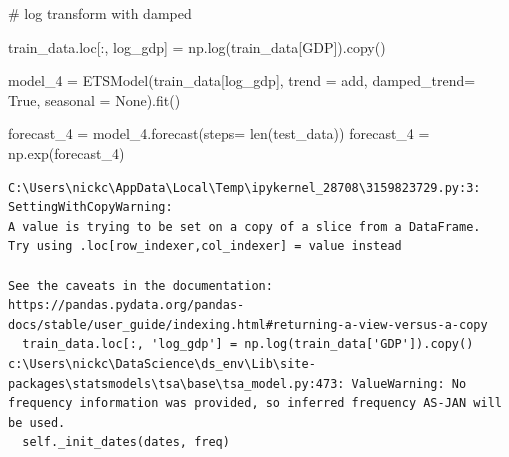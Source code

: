 \documentclass[
  11pt,
]{article}
\newenvironment{Shaded}{\begin{snugshade}}{\end{snugshade}}
\newcommand{\BuiltInTok}[1]{\textcolor[rgb]{0.00,0.23,0.31}{#1}}
\newcommand{\CommentTok}[1]{\textcolor[rgb]{0.37,0.37,0.37}{#1}}
\newcommand{\NormalTok}[1]{\textcolor[rgb]{0.00,0.23,0.31}{#1}}
\newcommand{\OperatorTok}[1]{\textcolor[rgb]{0.37,0.37,0.37}{#1}}
\newcommand{\StringTok}[1]{\textcolor[rgb]{0.13,0.47,0.30}{#1}}
\newcommand{\VariableTok}[1]{\textcolor[rgb]{0.07,0.07,0.07}{#1}}
\begin{document}
\begin{Shaded}
\begin{Highlighting}[]
\CommentTok{\# log transform with damped}

\NormalTok{train\_data.loc[:, }\StringTok{\textquotesingle{}log\_gdp\textquotesingle{}}\NormalTok{] }\OperatorTok{=}\NormalTok{ np.log(train\_data[}\StringTok{\textquotesingle{}GDP\textquotesingle{}}\NormalTok{]).copy() }

\NormalTok{model\_4 }\OperatorTok{=}\NormalTok{ ETSModel(train\_data[}\StringTok{\textquotesingle{}log\_gdp\textquotesingle{}}\NormalTok{], trend }\OperatorTok{=} \StringTok{\textquotesingle{}add\textquotesingle{}}\NormalTok{, damped\_trend}\OperatorTok{=} \VariableTok{True}\NormalTok{, seasonal }\OperatorTok{=} \VariableTok{None}\NormalTok{).fit()}

\NormalTok{forecast\_4 }\OperatorTok{=}\NormalTok{ model\_4.forecast(steps}\OperatorTok{=} \BuiltInTok{len}\NormalTok{(test\_data))}
\NormalTok{forecast\_4 }\OperatorTok{=}\NormalTok{ np.exp(forecast\_4)}
\end{Highlighting}
\end{Shaded}

\begin{verbatim}
C:\Users\nickc\AppData\Local\Temp\ipykernel_28708\3159823729.py:3: SettingWithCopyWarning: 
A value is trying to be set on a copy of a slice from a DataFrame.
Try using .loc[row_indexer,col_indexer] = value instead

See the caveats in the documentation: https://pandas.pydata.org/pandas-docs/stable/user_guide/indexing.html#returning-a-view-versus-a-copy
  train_data.loc[:, 'log_gdp'] = np.log(train_data['GDP']).copy()
c:\Users\nickc\DataScience\ds_env\Lib\site-packages\statsmodels\tsa\base\tsa_model.py:473: ValueWarning: No frequency information was provided, so inferred frequency AS-JAN will be used.
  self._init_dates(dates, freq)
\end{verbatim}
\end{document}
